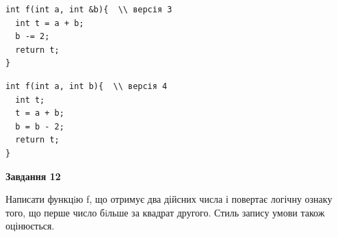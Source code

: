 \documentclass[12pt, ukrainian]{article}
\begin{document}
{\begin {large}
\begin{minipage}[t]{11.0cm}
\vspace{-8mm}\begin{verbatim}
int f(int a, int &b){  \\ версія 3
  int t = a + b;
  b -= 2;
  return t;
}
\end{verbatim}

\vspace{-8mm}\begin{verbatim}
int f(int a, int b){  \\ версія 4
  int t;
  t = a + b;
  b = b - 2;
  return t;
}
\end{verbatim}



\begin{center}
\textbf{Завдання 12}
\end{center}

Написати функцiю f, що отримує два дійсних числа і повертає логічну ознаку того, що перше число бiльше за квадрат другого. Стиль запису умови також оцінюється.\par

\end{minipage}

\end {large}}
\newpage
\end{document}
